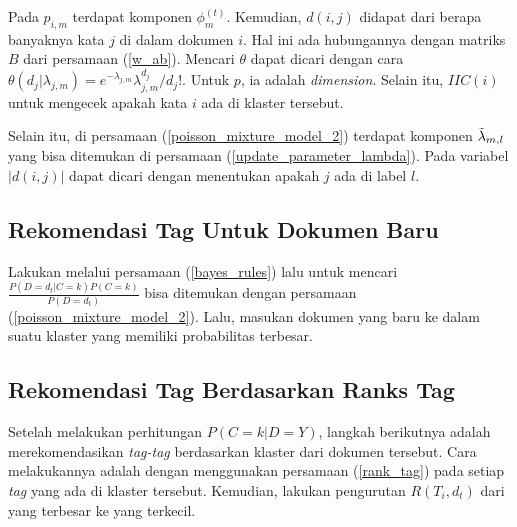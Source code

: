 Pada $p_{i,m}$ terdapat komponen $\phi^{(t)}_m$. Kemudian, $d(i,j)$ didapat dari berapa banyaknya kata $j$ di dalam dokumen $i $. Hal ini ada hubungannya dengan matriks $B$ dari persamaan (\ref{w_ab}). Mencari $\theta$ dapat dicari dengan cara $\theta(d_j | \lambda_{j,m}) = e^{- \lambda_{j,m}}\lambda_{j,m}^{d_j}/d_j!$. Untuk $p$, ia adalah \textit{dimension}. Selain itu, $IIC(i)$ untuk mengecek apakah kata $i$ ada di klaster tersebut. 

Selain itu, di persamaan (\ref{poisson_mixture_model_2}) terdapat komponen $\Tilde{\lambda}_{m,l}$ yang bisa ditemukan di persamaan (\ref{update_parameter_lambda}). Pada variabel $|d(i,j)|$ dapat dicari dengan menentukan apakah $j$ ada di label $l$.

\subsection{Rekomendasi Tag Untuk Dokumen Baru}

Lakukan melalui persamaan (\ref{bayes_rules}) lalu untuk mencari $\frac{P(D = d_t|C = k) P(C=k)}{P(D=d_t)}$ bisa ditemukan dengan persamaan (\ref{poisson_mixture_model_2}). Lalu, masukan dokumen yang baru ke dalam suatu klaster yang memiliki probabilitas terbesar.

\subsection{Rekomendasi Tag Berdasarkan Ranks Tag}

Setelah melakukan perhitungan $P(C = k|D = Y)$, langkah berikutnya adalah merekomendasikan \textit{tag-tag} berdasarkan klaster dari dokumen tersebut. Cara melakukannya adalah dengan menggunakan persamaan (\ref{rank_tag}) pada setiap \textit{tag} yang ada di klaster tersebut. Kemudian, lakukan pengurutan $R(T_i, d_t)$ dari yang terbesar ke yang terkecil.




